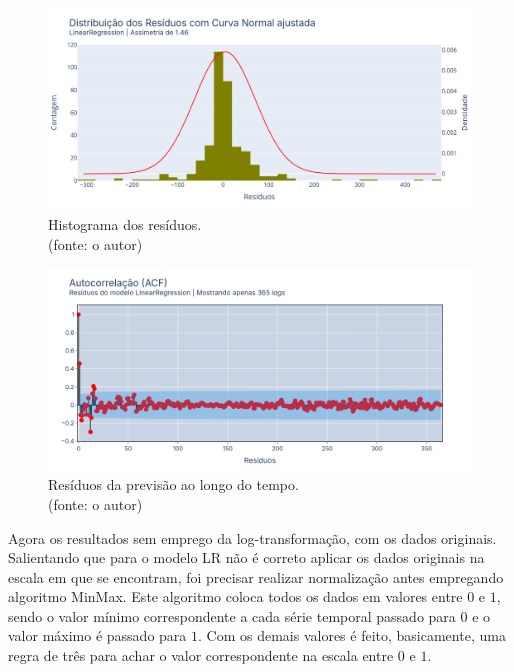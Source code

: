 \begin{figure}[!h]
	\centering
	\includegraphics[scale=0.33]{Figuras/jequiti/resultados/LR_WFV_LOG_RESID_x_CURVA_NORMAL.png}
	\caption{Histograma dos resíduos.\\(fonte: o autor)}
	\label{fig:jequiti_LR_WFV_LOG_RESID_x_CURVA_NORMAL}
\end{figure}

\begin{figure}[!h]
	\centering
	\includegraphics[scale=0.33]{Figuras/jequiti/resultados/LR_WFV_LOG_RESID_ACF.png}
	\caption{Resíduos da previsão ao longo do tempo.\\(fonte: o autor)}
	\label{fig:jequiti_LR_WFV_LOG_RESID_ACF}
\end{figure}
\clearpage

Agora os resultados sem emprego da log-transformação, com os dados originais. Salientando que para o modelo LR não é correto aplicar os dados originais na escala em que se encontram, foi precisar realizar normalização antes empregando algoritmo MinMax. Este algoritmo coloca todos os dados em valores entre $0$ e $1$, sendo o valor mínimo correspondente a cada série temporal passado para $0$ e o valor máximo é passado para $1$. Com os demais valores é feito, basicamente, uma regra de três para achar o valor correspondente na escala entre $0$ e $1$.

